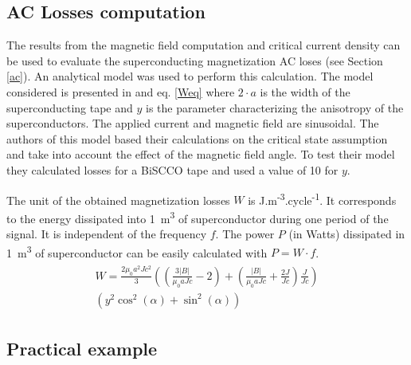 \documentclass{ws-jmrr}
\begin{document}
\begin{multicols}{2}
\subsection{AC Losses computation}
\label{aclosses}
The results from the magnetic field computation and critical current density can be used to evaluate the superconducting magnetization AC loses (see Section \ref{ac}). An analytical model was used to perform this calculation. The model considered is presented in \cite{zhang2003angular} and eq. \ref{Weq} where $2\cdot a$ is the width of the superconducting tape and $y$ is the parameter characterizing the anisotropy of the superconductors. The applied current and magnetic field are sinusoidal. The authors of this model based their calculations on the critical state assumption \cite{bean1962magnetization} and take into account the effect of the magnetic field angle. To test their model they calculated losses for a BiSCCO tape and used a value of 10 for $y$. \par
The unit of the obtained magnetization losses $W$ is J.m\textsuperscript{-3}.cycle\textsuperscript{-1}. It corresponds to the energy dissipated into 1~m\textsuperscript{3} of superconductor during one period of the signal. It is independent of the frequency $f$. The power $P$ (in Watts) dissipated in 1~m\textsuperscript{3} of superconductor can be easily calculated with $P=W\cdot f$. 
\begin{align}
\begin{split}
W=\frac{2\mu_0a^2Jc^2}{3}\left ( \left (\frac{3\left |B  \right |}{\mu_0aJc}-2  \right  )+\left (\frac{\left |B  \right |}{\mu_0aJc}+\frac{2J}{Jc}  \right )\frac{J}{Jc}\right ) \\ \left ( y^2\cos^2(\alpha )+\sin^2(\alpha ) \right )
\label{Weq}
\end{split}
\end{align}
   

\subsection{Practical example}


\end{multicols}
\end{document}
